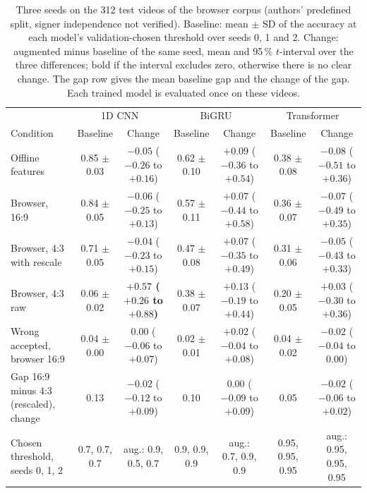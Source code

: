 \documentclass[conference]{IEEEtran}
\begin{document}
\begin{table}[t]
\caption{Three seeds on the 312 test videos of the browser corpus (authors' predefined split, signer independence not verified). Baseline: mean $\pm$ SD of the accuracy at each model's validation-chosen threshold over seeds 0, 1 and 2. Change: augmented minus baseline of the same seed, mean and 95\,\% $t$-interval over the three differences; bold if the interval excludes zero, otherwise there is no clear change. The gap row gives the mean baseline gap and the change of the gap. Each trained model is evaluated once on these videos.}
\label{tab:arch}
\centering
\footnotesize
\setlength{\tabcolsep}{3pt}
\begin{tabular}{lcccccc}
\hline
 & \multicolumn{2}{c}{1D CNN} & \multicolumn{2}{c}{BiGRU} & \multicolumn{2}{c}{Transformer}\\
Condition & Baseline & Change & Baseline & Change & Baseline & Change\\
\hline
Offline features & 0.85 $\pm$ 0.03 & $-0.05$ ($-0.26$ to $+0.16$) & 0.62 $\pm$ 0.10 & $+0.09$ ($-0.36$ to $+0.54$) & 0.38 $\pm$ 0.08 & $-0.08$ ($-0.51$ to $+0.36$)\\
Browser, 16:9 & 0.84 $\pm$ 0.05 & $-0.06$ ($-0.25$ to $+0.13$) & 0.57 $\pm$ 0.11 & $+0.07$ ($-0.44$ to $+0.58$) & 0.36 $\pm$ 0.07 & $-0.07$ ($-0.49$ to $+0.35$)\\
Browser, 4:3 with rescale & 0.71 $\pm$ 0.05 & $-0.04$ ($-0.23$ to $+0.15$) & 0.47 $\pm$ 0.08 & $+0.07$ ($-0.35$ to $+0.49$) & 0.31 $\pm$ 0.06 & $-0.05$ ($-0.43$ to $+0.33$)\\
Browser, 4:3 raw & 0.06 $\pm$ 0.02 & \textbf{$+0.57$ ($+0.26$ to $+0.88$)} & 0.38 $\pm$ 0.07 & $+0.13$ ($-0.19$ to $+0.44$) & 0.20 $\pm$ 0.05 & $+0.03$ ($-0.30$ to $+0.36$)\\
Wrong accepted, browser 16:9 & 0.04 $\pm$ 0.00 & $0.00$ ($-0.06$ to $+0.07$) & 0.02 $\pm$ 0.01 & $+0.02$ ($-0.04$ to $+0.08$) & 0.04 $\pm$ 0.02 & $-0.02$ ($-0.04$ to $0.00$)\\
Gap 16:9 minus 4:3 (rescaled), change & 0.13 & $-0.02$ ($-0.12$ to $+0.09$) & 0.10 & $0.00$ ($-0.09$ to $+0.09$) & 0.05 & $-0.02$ ($-0.06$ to $+0.02$)\\
Chosen threshold, seeds 0, 1, 2 & 0.7, 0.7, 0.7 & aug.: 0.9, 0.5, 0.7 & 0.9, 0.9, 0.9 & aug.: 0.7, 0.9, 0.9 & 0.95, 0.95, 0.95 & aug.: 0.95, 0.95, 0.95\\
\hline
\end{tabular}
\end{table}
\end{document}
